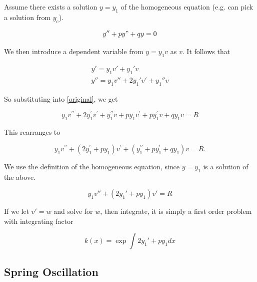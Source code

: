 Assume there exists a solution $y=y_1$ of the homogeneous equation (e.g. can pick a solution from $y_c$).

\begin{eqnarray}
    y''+py"+qy=0
\end{eqnarray}

We then introduce a dependent variable from $y=y_1v$ as $v$. It follows that

\begin{eqnarray}
    y'=y_1v'+y_1'v\\
    y''=y_1v''+2y_1'v'+y_1''v
\end{eqnarray}

So substituting into \ref{original}, we get

\begin{equation}
    y_{1} v^{\prime \prime}+2 y_{1}^{\prime} v^{\prime}+y_{1}^{\prime \prime} v+p y_{1} v^{\prime}+p y_{1}^{\prime} v+q y_{1} v=R
\end{equation}

This rearranges to

\begin{equation}
    y_{1} v^{\prime \prime}+\left(2 y_{1}^{\prime}+p y_{1}\right) v^{\prime}+\left(y_{1}^{\prime \prime}+p y_{1}^{\prime}+q y_{1}\right) v=R .
\end{equation}

We use the definition of the homogeneous equation, since $y=y_1$ is a solution of the above.

\begin{equation}
    y_1v''+(2y_1'+py_1)v'=R
\end{equation}

If we let $v'=w$ and solve for $w$, then integrate, it is simply a first order problem with integrating factor

\begin{equation}
    k(x)=\exp{\int 2y_1'+py_1 dx}
\end{equation}

\subsection{Spring Oscillation}


